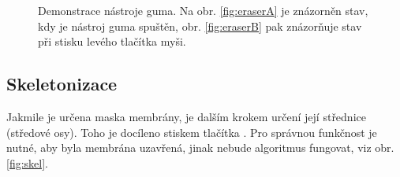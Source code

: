 \begin{figure}[htb]
	\centering
	\hskip 0.1cm
	\caption{Demonstrace nástroje guma. Na obr. \ref{fig:eraserA} je znázorněn stav, kdy je nástroj guma spuštěn, obr. \ref{fig:eraserB} pak znázorňuje stav při stisku levého tlačítka myši.}
	\label{fig:eraser}
\end{figure}

\subsection{Skeletonizace}
Jakmile je určena maska membrány, je dalším krokem určení její střednice (středové osy). Toho je docíleno stiskem tlačítka . Pro správnou funkčnost je nutné, aby byla membrána uzavřená, jinak nebude algoritmus fungovat, viz obr. \ref{fig:skel}. 


